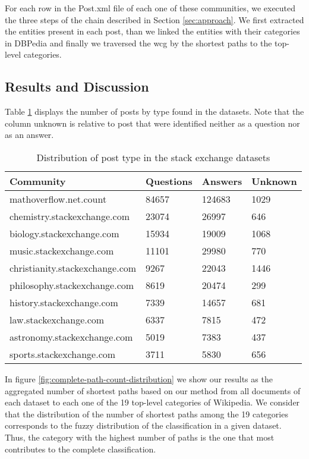 For each row in the Post.xml file of each one of these communities, we executed the three steps of the chain described in Section \ref{sec:approach}. We first extracted the entities present in each post, than we linked the entities with their categories in DBPedia and finally we traversed the \gls{wcg} by the shortest paths to the top-level categories. 



\subsection{\hspace*{3pt} Results and Discussion}


Table \ref{tab:stackdist} displays the number of posts by type found in the datasets. Note that the column unknown is relative to post that were identified neither as a question nor as an answer. 


\begin{table}[htpb]
\centering
\caption{Distribution of post type in the stack exchange datasets}
\label{tab:stackdist}
\begin{tabular}{@{}llll@{}}
\toprule
Community                            & Questions & Answers & Unknown \\ \midrule
mathoverflow.net.count               & 84657     & 124683  & 1029    \\
chemistry.stackexchange.com    & 23074     & 26997   & 646     \\
biology.stackexchange.com      & 15934     & 19009   & 1068    \\
music.stackexchange.com        & 11101     & 29980   & 770     \\
christianity.stackexchange.com & 9267      & 22043   & 1446    \\
philosophy.stackexchange.com   & 8619      & 20474   & 299     \\
history.stackexchange.com      & 7339      & 14657   & 681     \\
law.stackexchange.com          & 6337      & 7815    & 472     \\
astronomy.stackexchange.com    & 5019      & 7383    & 437     \\
sports.stackexchange.com       & 3711      & 5830    & 656     \\ \bottomrule
\end{tabular}%

\end{table}


In figure \ref{fig:complete-path-count-distribution} we show our results as the aggregated number of shortest paths based on our method from all documents of each dataset to each one of the 19 top-level categories of Wikipedia.
We consider that the distribution of the number of shortest paths among the 19 categories corresponds to the fuzzy distribution of the classification in a given dataset. Thus, the category with the highest number of paths is the one that most contributes to the complete classification.



